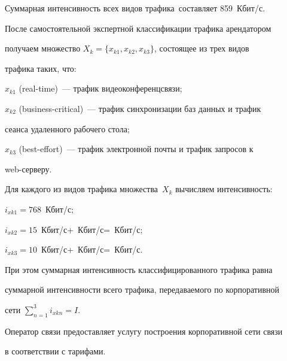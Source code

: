 Суммарная интенсивность всех видов трафика~$ $составляет 859~Кбит/с.





   После самостоятельной экспертной классификации трафика арендатором 


получаем множество $X_k=\{x_{k1}, x_{k2}, x_{k3}\}$, состоящее из трех видов 


трафика таких, что: 


   


     $x_{k1}$ (real-time)~--- трафик видеоконференцсвязи;


     


     $x_{k2}$ (business-critical)~--- трафик синхронизации баз данных и трафик 


сеанса удаленного рабочего стола;


     


     $x_{k3}$ (best-effort)~--- трафик электронной почты и трафик запросов к 


web-сер\-веру.


     


   Для каждого из видов трафика множества~$X_k$ вычисляем интенсивность: 


   


     $i_{xk1} = 768$~Кбит/с;


     


     $i_{xk2} = 15$~Кбит/с\;+~Кбит/с\;=~Кбит/с;


     


     $i_{xk3} = 10$~Кбит/с\;+~Кбит/с\;=~Кбит/с.


     


   При этом суммарная интенсивность классифицированного трафика равна 


суммарной интенсивности всего трафика, передаваемого по корпоративной 


сети $\sum\limits_{n=1}^3 i_{xkn}=I$.





   Оператор связи предоставляет услугу построения корпоративной сети связи 


в соответствии с тарифами.


